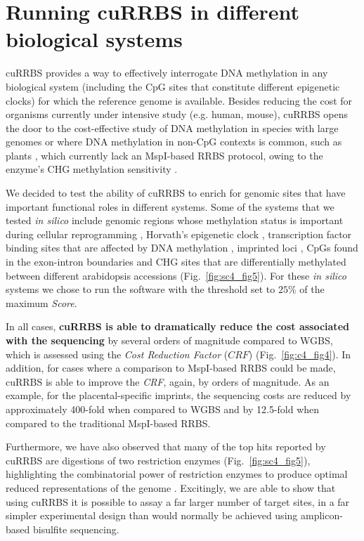 \section{Running cuRRBS in different biological systems}

\smallskip

cuRRBS provides a way to effectively interrogate DNA methylation in any biological system (including the CpG sites that constitute different epigenetic clocks) for which the reference genome is available. Besides reducing the cost for organisms currently under intensive study (e.g. human, mouse), cuRRBS opens the door to the cost-effective study of DNA methylation in species with large genomes or where DNA methylation in non-CpG contexts is common, such as plants \citep{Stroud2013}, which currently lack an MspI-based RRBS protocol, owing to the enzyme’s CHG methylation sensitivity \citep{Sun2014}.

\bigskip

We decided to test the ability of cuRRBS to enrich for genomic sites that have important functional roles in different systems. Some of the systems that we tested \textit{in silico} include genomic regions whose methylation status is important during cellular reprogramming \citep{Milagre2017}, Horvath's epigenetic clock \citep{Horvath2013}, transcription factor binding sites that are affected by DNA methylation \citep{Maurano2015,Domcke2015}, imprinted loci \citep{Hanna2016}, CpGs found in the exon-intron boundaries \citep{LevMaor2015} and CHG sites that are differentially methylated between different arabidopsis accessions \citep{Kawakatsu2016} (Fig.~\ref{fig:sc4_fig5}). For these \textit{in silico} systems we chose to run the software with the threshold set to $25\%$ of the maximum \textit{Score}.

\bigskip

In all cases, \textbf{cuRRBS is able to dramatically reduce the cost associated with the sequencing} by several orders of magnitude compared to WGBS, which is assessed using the \textit{Cost Reduction Factor} ($CRF$) (Fig.~\ref{fig:c4_fig4}). In addition, for cases where a comparison to MspI-based RRBS could be made, cuRRBS is able to improve the \textit{CRF}, again, by orders of magnitude. As an example, for the placental-specific imprints, the sequencing costs are reduced by approximately 400-fold when compared to WGBS and by 12.5-fold when compared to the traditional MspI-based RRBS.

\bigskip

Furthermore, we have also observed that many of the top hits reported by cuRRBS are digestions of two restriction enzymes (Fig.~\ref{fig:sc4_fig5}), highlighting the combinatorial power of restriction enzymes to produce optimal reduced representations of the genome \citep{Bystrykh2013}. Excitingly, we are able to show that using cuRRBS it is possible to assay a far larger number of target sites, in a far simpler experimental design than would normally be achieved using amplicon-based bisulfite sequencing.


